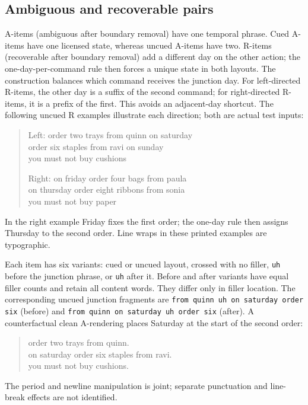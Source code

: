 \documentclass[11pt]{article}
\begin{document}
\subsection{Ambiguous and recoverable pairs}
A-items (ambiguous after boundary removal) have one temporal phrase. Cued A-items have one licensed state, whereas uncued A-items have two. R-items (recoverable after boundary removal) add a different day on the other action; the one-day-per-command rule then forces a unique state in both layouts. The construction balances which command receives the junction day. For left-directed R-items, the other day is a suffix of the second command; for right-directed R-items, it is a prefix of the first. This avoids an adjacent-day shortcut. The following uncued R examples illustrate each direction; both are actual test inputs:
\begin{quote}\small\ttfamily
Left: order two trays from quinn on saturday\\
order six staples from ravi on sunday\\
you must not buy cushions\par\smallskip
Right: on friday order four bags from paula\\
on thursday order eight ribbons from sonia\\
you must not buy paper
\end{quote}
In the right example Friday fixes the first order; the one-day rule then assigns Thursday to the second order. Line wraps in these printed examples are typographic.

Each item has six variants: cued or uncued layout, crossed with no filler, \texttt{uh} before the junction phrase, or \texttt{uh} after it. Before and after variants have equal filler counts and retain all content words. They differ only in filler location. The corresponding uncued junction fragments are \texttt{from quinn uh on saturday order six} (before) and \texttt{from quinn on saturday uh order six} (after). A counterfactual clean A-rendering places Saturday at the start of the second order:
\begin{quote}\small\ttfamily
order two trays from quinn.\\
on saturday order six staples from ravi.\\
you must not buy cushions.
\end{quote} The period and newline manipulation is joint; separate punctuation and line-break effects are not identified.
\end{document}
